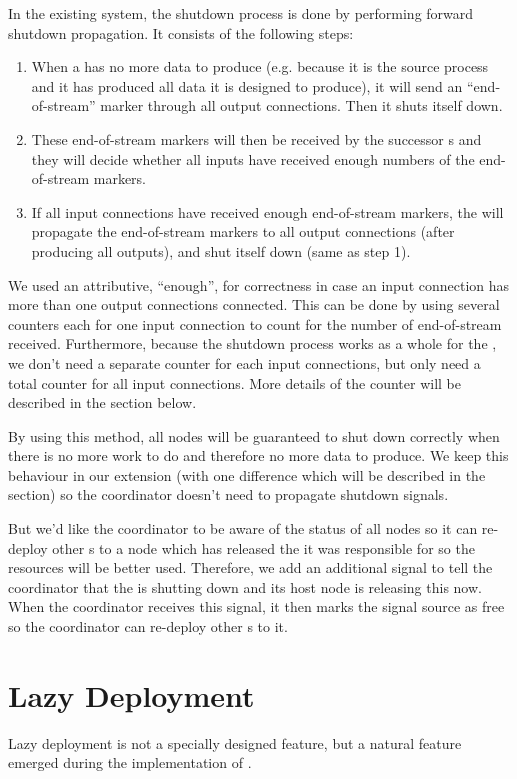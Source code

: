 \newcommand{\dEOS}{end-of-stream\xspace}

In the existing \dpy system, the shutdown process is done by performing forward shutdown propagation. It consists of the following steps:
\begin{enumerate}
	\item When a \tPEInst has no more data to produce (e.g. because it is the source process and it has produced all data it is designed to produce), it will send an ``\dEOS'' marker through all output connections. Then it shuts itself down.
	\item These \dEOS markers will then be received by the successor \tPEInst{}s and they will decide whether all inputs have received enough numbers of the \dEOS markers.
	\item If all input connections have received enough \dEOS markers, the \tPEInst will propagate the \dEOS markers to all output connections (after producing all outputs), and shut itself down (same as step 1).
\end{enumerate}

We used an attributive, ``enough'', for correctness in case an input connection has more than one output connections connected. This can be done by using several counters each for one input connection to count for the number of \dEOS received. Furthermore, because the shutdown process works as a whole for the \tPEInst, we don't need a separate counter for each input connections, but only need a total counter for all input connections. More details of the counter will be described in the  section below.

By using this method, all nodes will be guaranteed to shut down correctly when there is no more work to do and therefore no more data to produce. We keep this behaviour in our extension (with one difference which will be described in the  section) so the coordinator doesn't need to propagate shutdown signals.

But we'd like the coordinator to be aware of the status of all nodes so it can re-deploy other \tPEInst{}s to a node which has released the \tPEInst it was responsible for so the resources will be better used. Therefore, we add an additional signal to tell the coordinator that the \tPEInst is shutting down and its host node is releasing this \tPEInst now. When the coordinator receives this signal, it then marks the signal source as free so the coordinator can re-deploy other \tPEInst{}s to it.

\section{Lazy Deployment}
Lazy deployment is not a specially designed feature, but a natural feature emerged during the implementation of \tincdep.

